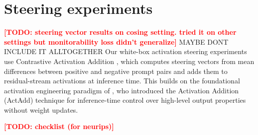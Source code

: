 \documentclass{article}
\newcommand{\todo}[1]{\textbf{\textcolor{red}{[TODO: #1]}}}
\begin{document}
\section{Steering experiments}
\label{app:steering}

\todo{steering vector results on cosing setting. tried it on other settings but monitorability loss didn't generalize}
MAYBE DONT INCLUDE IT ALLTOGETHER
Our white-box activation steering experiments use Contrastive Activation Addition \citep{panickssery2024caa}, which computes steering vectors from mean differences between positive and negative prompt pairs and adds them to residual-stream activations at inference time. This builds on the foundational activation engineering paradigm of \citet{turner2023actadd}, who introduced the Activation Addition (ActAdd) technique for inference-time control over high-level output properties without weight updates.

\todo{checklist (for neurips)}
% 
\end{document}
